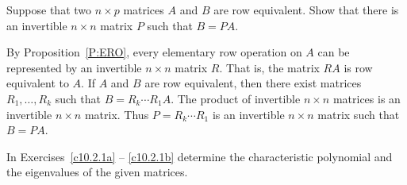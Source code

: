 \documentclass{article}
\begin{document}



\problemlabel

\begin{exercise}  \label{c10.1.c8} 
Suppose that two $n\times p$ matrices $A$ and $B$ are row
equivalent.  Show that there is an invertible
$n\times n$ matrix $P$ such that $B = PA$.

\begin{solution}

By Proposition~\ref{P:ERO}, every
elementary row operation on $A$ can be represented by an invertible $n
\times n$ matrix $R$.  That is, the matrix $RA$ is row equivalent to
$A$.  If $A$ and $B$ are row equivalent, then there exist matrices
$R_1,\ldots,R_k$ such that $B = R_k\cdots R_1A$.  The product of invertible $n
\times n$ matrices is an invertible $n \times n$ matrix.  Thus $P =
R_k\cdots R_1$ is an invertible $n \times n$ matrix such that $B =
PA$.

\end{solution}
\end{exercise}





\problemlabel

\noindent In Exercises~\ref{c10.2.1a} -- \ref{c10.2.1b} determine the 
characteristic polynomial and the eigenvalues of the given matrices.
\end{document}
